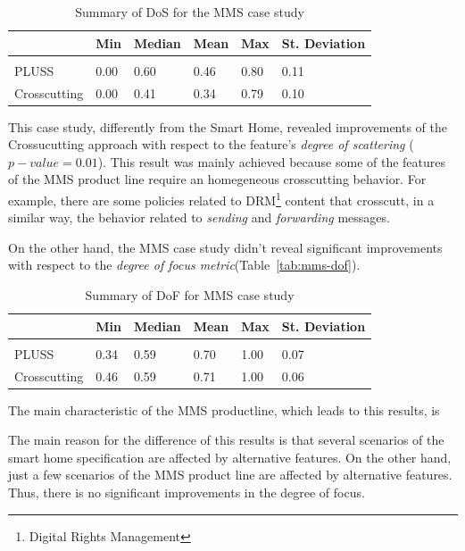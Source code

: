 \documentclass{acm_proc_article-sp}
\begin{document}
\begin{table}[htb] \centering
\caption{Summary of DoS for the MMS case study}
\label{tab:mms-dos}
\begin{small}
\begin{tabular}{llllll} \hline
					& Min 	& Median 	& Mean 	& Max 	& St. Deviation \\ \hline \\
	PLUSS			& 0.00  & 0.60   	& 0.46  & 0.80 	& 0.11 			\\
	Crosscutting	& 0.00  & 0.41   	& 0.34 	& 0.79 	& 0.10			\\ \hline	
\end{tabular}
\end{small}
\end{table}

This case study, differently from the Smart Home, revealed improvements of the
Crossucutting approach with respect to the feature's \emph{degree of scattering}
($p-value=0.01$). This result was mainly achieved because some of the features of
the MMS product line require an homegeneous crosscutting behavior. For example,
there are some policies related to DRM\footnote{Digital Rights Management}
content that crosscutt, in a similar way, the behavior related to \emph{sending}
and \emph{forwarding} messages.


On the other hand, the MMS case study didn't reveal significant
improvements with respect to the \emph{degree of focus
metric}(Table~\ref{tab:mms-dof}).

\begin{table}[htb] \centering
\caption{Summary of DoF for MMS case study}
\label{tab:mms-dos}
\begin{small}
\begin{tabular}{llllll} \hline
					& Min 	& Median 	& Mean 	& Max 	& St. Deviation \\ \hline \\
	PLUSS			& 0.34	& 0.59		& 0.70	& 1.00	& 0.07			\\
	Crosscutting	& 0.46  & 0.59   	& 0.71 	& 1.00 	& 0.06			\\ \hline	
\end{tabular}
\end{small}
\end{table}


The main characteristic of the MMS productline, which leads to
this results, is

The main reason for the difference of this results is
that several scenarios of the smart home specification are affected by
alternative features. On the other hand, just a few scenarios of the MMS
product line are affected by alternative features. Thus, there is no
significant improvements in the degree of focus.  
\end{document}
